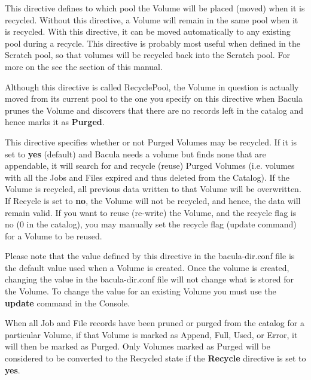 \begin{description}
\label{PoolRecyclePool}
\item [RecyclePool = \lt{}pool-resource-name\gt{}]
   This directive defines to which pool
   the Volume will be placed (moved) when it is recycled. Without
   this directive, a Volume will remain in the same pool when it is
   recycled. With this directive, it can be moved automatically to any
   existing pool during a recycle. This directive is probably most
   useful when defined in the Scratch pool, so that volumes will
   be recycled back into the Scratch pool. For more on the see the   
    section of this manual.

   Although this directive is called RecyclePool, the Volume in
   question is actually moved from its current pool to the one
   you specify on this directive when Bacula prunes the Volume and
   discovers that there are no records left in the catalog and hence
   marks it as {\bf Purged}.
        
   
\label{PoolRecycle}
\item [Recycle = \lt{}yes\vb{}no\gt{}]
   This directive specifies whether or not Purged Volumes may be recycled.
   If it is set to {\bf yes} (default) and Bacula needs a volume but finds
   none that are appendable, it will search for and recycle (reuse) Purged
   Volumes (i.e.  volumes with all the Jobs and Files expired and thus
   deleted from the Catalog).  If the Volume is recycled, all previous data
   written to that Volume will be overwritten. If Recycle is set to {\bf
   no}, the Volume will not be recycled, and hence, the data will remain
   valid.  If you want to reuse (re-write) the Volume, and the recycle flag
   is no (0 in the catalog), you may manually set the recycle flag (update
   command) for a Volume to be reused.

   Please note that the value defined by this directive in the
   bacula-dir.conf file is the default value used when a Volume is created.
   Once the volume is created, changing the value in the bacula-dir.conf
   file will not change what is stored for the Volume.  To change the value
   for an existing Volume you must use the {\bf update} command in the
   Console.

   When all Job and File records have been pruned or purged from the      
   catalog for a particular Volume, if that Volume is marked as
   Append, Full, Used, or Error, it will then be marked as Purged. Only
   Volumes marked as Purged will be considered to be converted to the
   Recycled state if the {\bf Recycle} directive is set to {\bf yes}.



\end{description}
